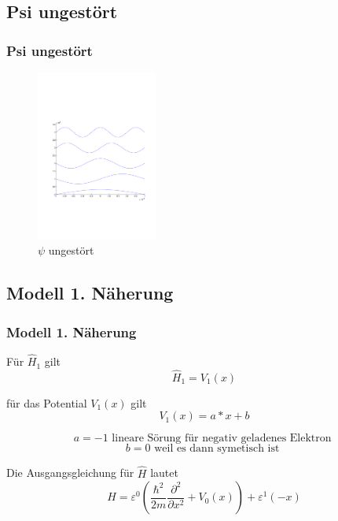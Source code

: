 \documentclass[aspectratio=169]{beamer}
\begin{document}
\subsection{ Psi ungest\"ort }
\begin{frame}
  \frametitle{ Psi ungest\"ort }
  \begin{figure}
    \centering
    \includegraphics[height=5.6cm,clip=true,trim=2cm 7cm 1cm 8cm]{../../skript/efeld/Psi_ungestoert.pdf}
    \caption{$\psi$ ungest\"ort}
    \label{abb:efeld_psi_ungestoert}
  \end{figure}

\end{frame}

\subsection{ Modell 1. N\"aherung }
\begin{frame} 
  \frametitle{ Modell 1. N\"aherung }

  F\"ur $\hat H_1$ gilt
  \[
    \hat H_1 =  V_1(x)
  \]

  f\"ur das Potential $V_1(x)$ gilt
  \[
    V_1(x) = a*x +b 
  \]
  
  \[
  a = -1 \text{ lineare S\"orung f\"ur negativ geladenes Elektron }
  \]
  \[
  b = 0 \text{ weil es dann symetisch ist }
  \]

  Die Ausgangsgleichung f\"ur $\hat{H}$ lautet
  \[
    \hat{H} = \varepsilon^0 ( \frac{\hbar^2}{2m} \frac{\partial^2}{\partial x^2} + V_0(x) )
               + \varepsilon^1 (  - x )
  \]
\end{frame}
\end{document}
